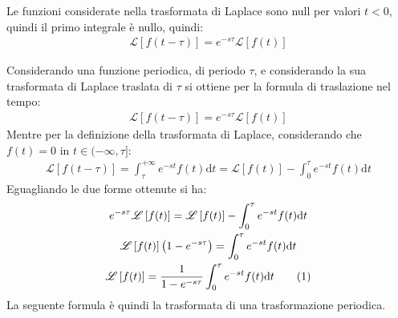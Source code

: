 \documentclass{article}
\newcommand{\df}{\mathrm{d}}
\numberwithin{equation}{subsection}
\newcommand{\tageq}{\tag{\stepcounter{equation}\theequation}}
\begin{document}
Le funzioni considerate nella trasformata di Laplace sono null per valori $t<0$, quindi il primo integrale è nullo, quindi:
\begin{gather*}
    \mathscr{L}\left[f(t-\tau)\right]=e^{-s\tau}\mathscr{L}\left[f(t)\right]
\end{gather*}


Considerando una funzione periodica, di periodo $\tau$, e considerando la sua trasformata di Laplace traslata di $\tau$ si ottiene per la formula di traslazione nel tempo:
\begin{gather*}
    \mathscr{L}\left[f(t-\tau)\right]=e^{-s\tau}\mathscr{L}\left[f(t)\right]
\end{gather*}
Mentre per la definizione della trasformata di Laplace, considerando che $f(t)=0$ in $t\in(-\infty,\tau]$:
\begin{gather*}
    \mathscr{L}\left[f(t-\tau)\right]=
    \int_{\tau}^{+\infty}e^{-st}f(t)\df t=\mathscr{L}\left[f(t)\right]-\int_0^\tau e^{-st}f(t)\df t
\end{gather*}
Eguagliando le due forme ottenute si ha:
\begin{gather*}
    e^{-s\tau}\mathscr{L}\left[f(t)\right]=\mathscr{L}\left[f(t)\right]-\int_0^\tau e^{-st}f(t)\df t\\
    \mathscr{L}\left[f(t)\right]\left(1-e^{-s\tau}\right)=\int_0^\tau e^{-st}f(t)\df t\\
    \mathscr{L}\left[f(t)\right]=\frac{1}{1-e^{-s\tau}}\int_0^\tau e^{-st}f(t)\df t\tageq
\end{gather*}
La seguente formula è quindi la trasformata di una trasformazione periodica. 
\end{document}
